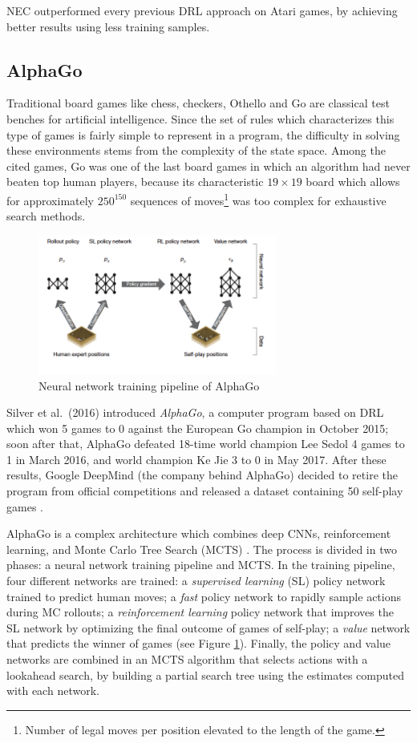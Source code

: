 NEC outperformed every previous DRL approach on Atari games, by achieving better
results using less training samples.

\subsection{AlphaGo}
Traditional board games like chess, checkers, Othello and Go are classical 
test benches for artificial intelligence. Since the set of rules which
characterizes this type of games is fairly simple to represent in a program, the
difficulty in solving these environments stems from the complexity of the 
state space. Among the cited games, Go was one of the last board games in which 
an algorithm had never beaten top human players, because its characteristic 
$19 \times 19$ board which allows for approximately $250^{150}$ sequences of
moves\footnote{Number of legal moves per position elevated to the length of the 
game.} was too complex for exhaustive search methods.
%
\begin{figure}[h]
\includegraphics[width=0.7\textwidth]{pictures/alphago}
\centering
\caption{Neural network training pipeline of AlphaGo}
\label{f:alphago}
\end{figure}
%

Silver et al.\ (2016) \cite{silver2016mastering} introduced \textit{AlphaGo}, 
a computer program based on DRL which won 5 games to 0 against the European Go 
champion in October 2015; soon after that, AlphaGo defeated 18-time world 
champion Lee Sedol 4 games to 1 in March 2016, and world champion Ke Jie 3 to 0 
in May 2017. After these results, Google DeepMind (the company behind 
AlphaGo) decided to retire the program from official competitions and released a
dataset containing 50 self-play games \cite{alphago}.

AlphaGo is a complex architecture which combines deep CNNs, reinforcement 
learning, and Monte Carlo Tree Search (MCTS) \cite{browne2012survey, gelly2012grand}. 
The process is divided in two phases: a neural network training pipeline and 
MCTS. In the training pipeline, four different networks are trained: a 
\textit{supervised learning} (SL) policy network trained to predict human moves;
a \textit{fast} policy network to rapidly sample actions during MC rollouts; a 
\textit{reinforcement learning} policy network that improves the SL network by 
optimizing the final outcome of games of self-play; a \textit{value} network 
that predicts the winner of games (see Figure \ref{f:alphago}). 
Finally, the policy and value networks are combined in an MCTS algorithm that 
selects actions with a lookahead search, by building a partial search tree using
the estimates computed with each network.

